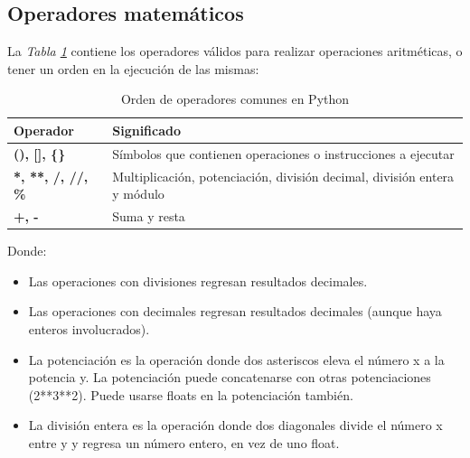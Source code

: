 \subsection{Operadores matemáticos}
\hspace{0.55cm}La \textit{Tabla \ref{tab: 2}} contiene los operadores válidos para realizar operaciones aritméticas, o tener un orden en la ejecución de las mismas:
\begin{table}[H]
    \begin{center}
        \caption{Orden de operadores comunes en Python}
        \label{tab: 2}
        \begin{tabular}{l|l}
            \hline
            \textbf{Operador} & \textbf{Significado} \\
            \hline
            \textbf{(), [], \{\}}		& Símbolos que contienen operaciones o instrucciones a ejecutar \\
            \textbf{*, **, /, //, \%}	& Multiplicación, potenciación, división decimal, división entera y módulo \\
            \textbf{+, -}				& Suma y resta \\
            \hline
        \end{tabular}
    \end{center}
\end{table}

Donde:
\begin{itemize}
	\item Las operaciones con divisiones regresan resultados decimales.
	\item Las operaciones con decimales regresan resultados decimales (aunque haya enteros involucrados).
	\item La potenciación es la operación donde dos asteriscos eleva el número x a la potencia y. La potenciación puede concatenarse con otras potenciaciones (2**3**2). Puede usarse floats en la potenciación también.
	\item La división entera es la operación donde dos diagonales divide el número x entre y y regresa un número entero, en vez de uno float.
\end{itemize}


